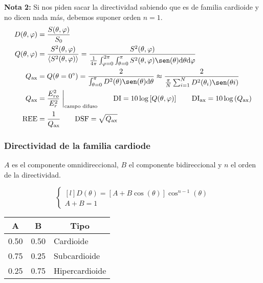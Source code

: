 \documentclass[a4paper, 8pt]{extarticle}
\renewcommand{\sin}{\sen}
\begin{document}
\begin{multicols}{3}
  \textbf{Nota 2:} Si nos piden sacar la directividad sabiendo que es de familia cardioide y no dicen nada más, debemos suponer orden $n=1$.
  \begin{align*}
    D( \theta, \varphi ) & = \frac{S(\theta, \varphi )}{S_0 }                                                                                                                                                                                                \\
    Q(\theta, \varphi )  & = \frac{S^2(\theta, \varphi )}{\langle S^2(\theta, \varphi) \rangle} = \frac{S^2(\theta, \varphi )}{\frac{1}{4\pi} \int_{\varphi = 0}^{2\pi} \int_{\theta = 0}^{\pi} S^2(\theta, \varphi) \sin (\theta ) \dd \theta \dd \varphi } \\
    Q_{\textnormal{ax}}  & = Q(\theta = \ang{0}) = \frac{2}{\int_{\theta = 0}^{\pi} D^2(\theta) \sin (\theta ) \dd \theta } \approx \frac{2}{\frac{\pi}{N} \sum _{i=1}^{N} D^2(\theta _i) \sin (\theta i)}                                                   \\
    Q_{\textnormal{ax}}  & = \frac{E^2_{ro}} {E^2_r} \eval*{}_{\text{campo difuso}} \qquad \text{DI} = 10 \log \left[ Q( \theta, \varphi) \right] \qquad \text{DI} _{\textnormal{ax}} = 10 \log \left( Q_{\textnormal{ax}} \right)                           \\
    \text{REE}           & = \frac{1}{Q_ {\textnormal{ax}}} \qquad \text{DSF} = \sqrt{Q_{\textnormal{ax}}}                                                                                                                                                   \\
  \end{align*}
  \subsubsection{Directividad de la familia cardiode}
  $A$ es el componente omnidireccional, $B$ el componente bidireccional y $n$ el orden de la directividad.

  \[\left\lbrace
    \begin{matrix*}[l]
      D (\theta ) = \left[ A + B \cos (\theta ) \right] \cos ^{n-1} (\theta )  \\
      A + B = 1
    \end{matrix*}\right.\]


  \begin{center}
    \begin{tabular}{|c|c|l|}
      \hline
      \rowcolor[rgb]{ .663,  .816,  .557} A    & B    & \multicolumn{1}{c|}{Tipo} \\
      \hline
      \rowcolor[rgb]{ .886,  .937,  .855} 0.50 & 0.50 & Cardioide                 \\
      \hline
      \rowcolor[rgb]{ .886,  .937,  .855} 0.75 & 0.25 & Subcardioide              \\
      \hline
      \rowcolor[rgb]{ .886,  .937,  .855} 0.25 & 0.75 & Hipercardioide            \\
      \hline
    \end{tabular}
  \end{center}


\end{multicols}
\end{document}
